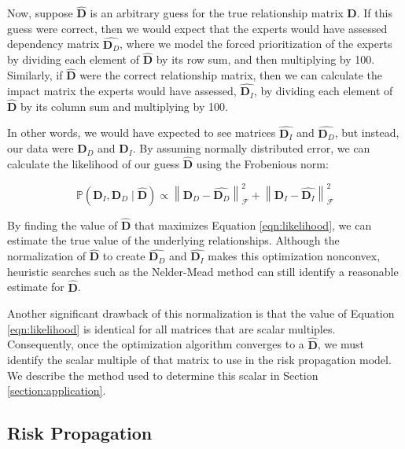 \documentclass{article}
\newcommand{\norm}[1]{\left\lVert #1 \right\rVert}
\begin{document}
Now, suppose $\widehat{\mathbf{D}}$ is an arbitrary guess for the true relationship matrix $\mathbf{D}$. If this guess were correct, then we would expect that the experts would have assessed dependency matrix $\widehat{\mathbf{D}_D}$, where we model the forced prioritization of the experts by dividing each element of $\widehat{\mathbf{D}}$ by its row sum, and then multiplying by 100. Similarly, if $\widehat{\mathbf{D}}$ were the correct relationship matrix, then we can calculate the impact matrix the experts would have assessed, $\widehat{\mathbf{D}_I}$, by dividing each element of $\widehat{\mathbf{D}}$ by its column sum and multiplying by 100.

In other words, we would have expected to see matrices $\widehat{\mathbf{D}_I}$ and $\widehat{\mathbf{D}_D}$, but instead, our data were $\mathbf{D}_D$ and $\mathbf{D}_I$. By assuming normally distributed error, we can calculate the likelihood of our guess $\widehat{\mathbf{D}}$ using the Frobenious norm:

\begin{equation}
\label{eqn:likelihood}
\mathbb{P}\left(\mathbf{D}_I, \mathbf{D}_D \mid \widehat{\mathbf{D}}\right) \propto \norm{\mathbf{D}_D - \widehat{\mathbf{D}_D }}_\mathcal{F}^2 + \norm{\mathbf{D}_I - \widehat{\mathbf{D}_I }}_\mathcal{F}^2
\end{equation}

By finding the value of $\widehat{\mathbf{D}}$ that maximizes Equation \ref{eqn:likelihood}, we can estimate the true value of the underlying relationships. Although the normalization of $\widehat{\mathbf{D}}$ to create $\widehat{\mathbf{D}_D}$ and $\widehat{\mathbf{D}_I}$ makes this optimization nonconvex, heuristic searches such as the Nelder-Mead method \citep{nelder1965simplex} can still identify a reasonable estimate for $\widehat{\mathbf{D}}$.

Another significant drawback of this normalization is that the value of Equation \ref{eqn:likelihood} is identical for all matrices that are scalar multiples. Consequently, once the optimization algorithm converges to a $\widehat{\mathbf{D}}$, we must identify the scalar multiple of that matrix to use in the risk propagation model. We describe the method used to determine this scalar in Section \ref{section:application}. 

\subsection{Risk Propagation}
\end{document}
